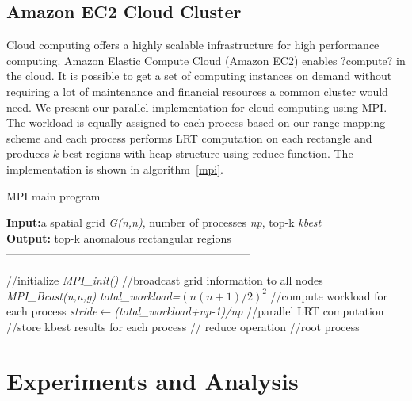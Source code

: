 \documentclass[AMA,LATO1COL]{WileyNJD-v2-bak}
\begin{document}
\subsection{Amazon EC2 Cloud Cluster }
Cloud computing offers a highly scalable infrastructure for high performance computing. Amazon Elastic Compute Cloud (Amazon EC2) enables ?compute? in the cloud. It is possible to get a set of computing instances on demand without requiring a lot of maintenance and financial resources a common cluster would need. We present our parallel implementation for cloud computing using MPI. The workload is equally assigned to each process based on our range mapping scheme and each process performs LRT computation on each rectangle and produces $k$-best regions with heap structure using reduce function. The implementation is shown in algorithm~\ref{mpi}.

\begin{algorithm}[t!]
\label{al}
\caption{ MPI main program}\label{mpi}
\textbf{Input:}a spatial grid \textit{G(n,n)}, number of processes \textit{np}, top-k \textit{kbest} \\
\textbf{Output:} top-k anomalous rectangular regions\\
------------------------------------------------------------------ \\
\begin{algorithmic}[1]
\State //initialize
\State \textit {MPI\_init()}
\State //broadcast grid information to all nodes
\State \textit {MPI\_Bcast(n,n,g)}
\State \textit {total\_workload=$(n(n+1)/2)^2$}
\State //compute workload for each process
\State \textit{stride\(\leftarrow\)(total\_workload+np-1)/np}
\State //parallel LRT computation
\State //store kbest results for each process
\State // reduce operation
\State //root process
\EndIf
{}
\end{algorithmic}
\end{algorithm}

\section{Experiments and Analysis}\label{EA}
\end{document}

